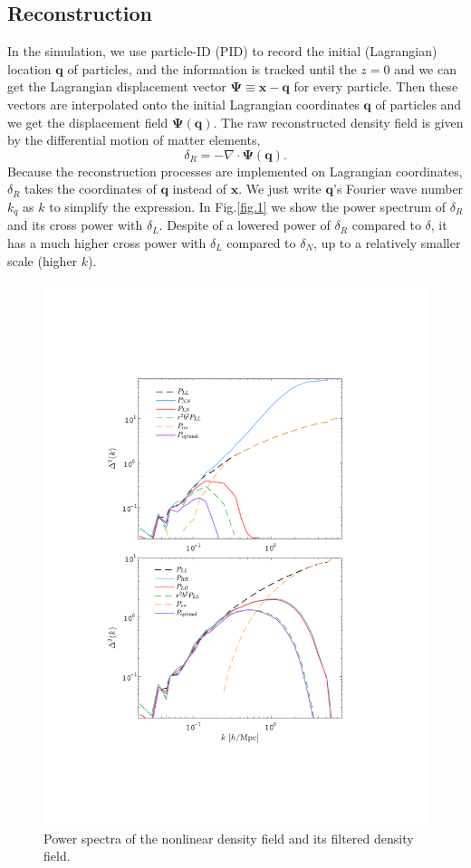 \documentclass[aps,prd,twocolumn,superscriptaddress,amsfont,amssymb,amsmath,nofootinbib,showpacs,balancelastpage]{revtex4-1}
\newcommand{\bs}{\boldsymbol}
\begin{document}
\subsection{Reconstruction}\label{ss.reco}
In the simulation, we use particle-ID (PID) to record the initial (Lagrangian) location ${\bs 
q}$ of particles, and the information is tracked until the $z=0$ and we can get the 
Lagrangian displacement vector ${\bs \Psi}\equiv{\bs x}-{\bs q}$ for every 
particle. Then these vectors are interpolated onto the initial Lagrangian 
coordinates ${\bs q}$ of particles and we get the displacement field ${\bs \Psi}
({\bs q})$.
The raw reconstructed density field is given by the differential motion of matter 
elements,
\begin{equation}
    \delta_R=-\nabla\cdot{\bs \Psi}({\bs q}).
\end{equation}
Because the reconstruction processes are implemented on Lagrangian coordinates,
$\delta_R$ takes the coordinates of $\bs q$ instead of $\bs x$.
We just write $\bs q$'s Fourier wave number
$k_q$ as $k$ to simplify the expression.
In Fig.\ref{fig.1} we show the power spectrum of $\delta_R$ and its cross power
with $\delta_L$. Despite of a lowered power of $\delta_R$ compared to $\delta$,
it has a much higher cross power with $\delta_L$ compared to $\delta_N$,
up to a relatively smaller scale (higher $k$).
\begin{figure}[t] \centering
  \includegraphics[width=1.0\linewidth]{recopower.pdf}
  \caption{Power spectra of the nonlinear density field and its
  filtered density field.}
  \label{fig.3}
\end{figure}
\end{document}
